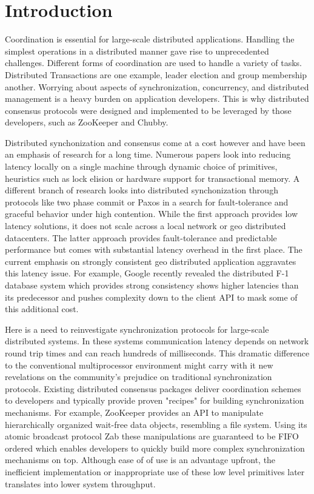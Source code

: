 \section{Introduction}\label{sec:intro}

Coordination is essential for large-scale distributed applications. Handling the simplest operations in a distributed manner gave rise to unprecedented challenges. Different forms of coordination are used to handle a variety of tasks. Distributed Transactions are one example, leader election and group membership another. Worrying about aspects of synchronization, concurrency, and distributed management is a heavy burden on application developers. This is why distributed consensus protocols were designed and implemented to be leveraged by those developers, such as ZooKeeper\cite{zookeeper} and Chubby\cite{chubby}.

Distributed synchonization and consensus come at a cost however and have been an emphasis of research for a long time. Numerous papers look into reducing latency locally on a single machine through dynamic choice of primitives\cite{reactive}, heuristics such as lock elision\cite{lock_elison} or hardware support for transactional memory\cite{transactional_memory}. A different branch of research looks into distributed synchonization through protocols like two phase commit\cite{two_phase_commit} or Paxos\cite{paxos} in a search for fault-tolerance and graceful behavior under high contention. While the first approach provides low latency solutions, it does not scale across a local network or geo distributed datacenters. The latter approach provides fault-tolerance and predictable performance but comes with substantial latency overhead in the first place. The current emphasis on strongly consistent geo distributed application aggravates this latency issue. For example, Google recently revealed the distributed F-1 database system \cite{google_f1} which provides strong consistency shows higher latencies than its predecessor and pushes complexity down to the client API to mask some of this additional cost.

Here is a need to reinvestigate synchronization protocols for large-scale distributed systems. In these systems communication latency depends on network round trip times and can reach hundreds of milliseconds. This dramatic difference to the conventional multiprocessor environment might carry with it new revelations on the community's prejudice on traditional synchronization protocols. Existing distributed consensus packages deliver coordination schemes to developers and typically provide proven "recipes" \cite{zookeeper_recipes} for building synchronization mechanisms. For example, ZooKeeper provides an API to manipulate hierarchically organized wait-free data objects, resembling a file system. Using its atomic broadcast protocol Zab\cite{ZAB} these manipulations are guaranteed to be FIFO ordered which enables developers to quickly build more complex synchronization mechanisms on top. Although ease of of use is an advantage upfront, the inefficient implementation or inappropriate use of these low level primitives later translates into lower system throughput.

